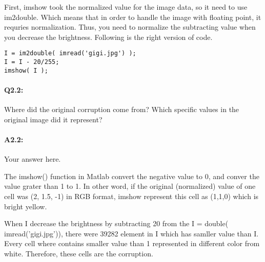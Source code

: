 \documentclass[11pt]{article}
\begin{document}
First, imshow took the normalized value for the image data, so it need to use im2double. Which means that in order to handle the image with floating point, it requries normalization. Thus, you need to normalize the subtracting value when you decrease the brightness. 
Following is the right version of code. 

\begin{lstlisting}[style=Matlab-editor]
I = im2double( imread('gigi.jpg') );
I = I - 20/255;
imshow( I );
\end{lstlisting}


\pagebreak
\paragraph{Q2.2:} Where did the original corruption come from? Which specific values in the original image did it represent?

\paragraph{A2.2:} Your answer here.

The imshow() function in Matlab convert the negative value to 0, and conver the value grater than 1 to 1. In other word, if the original (normalized) value of one cell was (2, 1.5, -1) in RGB format, imshow represent this cell as (1,1,0) which is bright yellow. 

When I decrease the brightness by subtracting 20 from the I = double( imread('gigi.jpg')), there were 39282 element in I which has samller value than I. Every cell where contains smaller value than 1 represented in different color from white. Therefore, these cells are the corruption.

\end{document}
